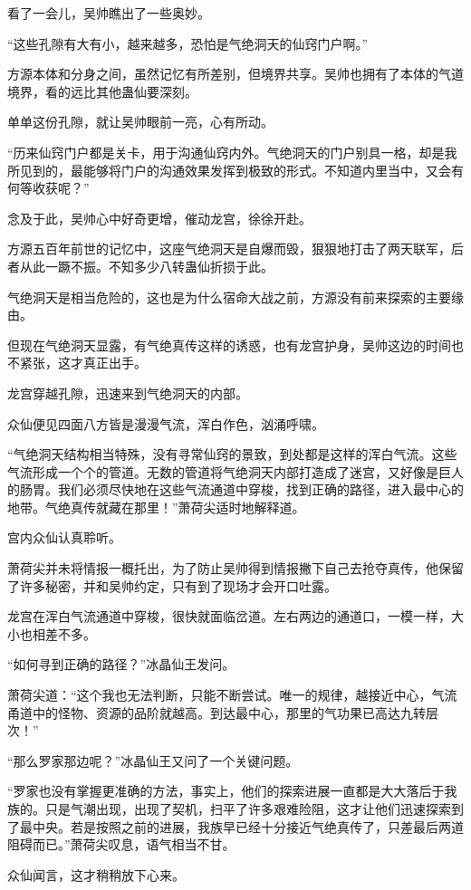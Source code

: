 \begin{this_body}
看了一会儿，吴帅瞧出了一些奥妙。

“这些孔隙有大有小，越来越多，恐怕是气绝洞天的仙窍门户啊。”

方源本体和分身之间，虽然记忆有所差别，但境界共享。吴帅也拥有了本体的气道境界，看的远比其他蛊仙要深刻。

单单这份孔隙，就让吴帅眼前一亮，心有所动。

“历来仙窍门户都是关卡，用于沟通仙窍内外。气绝洞天的门户别具一格，却是我所见到的，最能够将门户的沟通效果发挥到极致的形式。不知道内里当中，又会有何等收获呢？”

念及于此，吴帅心中好奇更增，催动龙宫，徐徐开赴。

方源五百年前世的记忆中，这座气绝洞天是自爆而毁，狠狠地打击了两天联军，后者从此一蹶不振。不知多少八转蛊仙折损于此。

气绝洞天是相当危险的，这也是为什么宿命大战之前，方源没有前来探索的主要缘由。

但现在气绝洞天显露，有气绝真传这样的诱惑，也有龙宫护身，吴帅这边的时间也不紧张，这才真正出手。

龙宫穿越孔隙，迅速来到气绝洞天的内部。

众仙便见四面八方皆是漫漫气流，浑白作色，汹涌呼啸。

“气绝洞天结构相当特殊，没有寻常仙窍的景致，到处都是这样的浑白气流。这些气流形成一个个的管道。无数的管道将气绝洞天内部打造成了迷宫，又好像是巨人的肠胃。我们必须尽快地在这些气流通道中穿梭，找到正确的路径，进入最中心的地带。气绝真传就藏在那里！”萧荷尖适时地解释道。

宫内众仙认真聆听。

萧荷尖并未将情报一概托出，为了防止吴帅得到情报撇下自己去抢夺真传，他保留了许多秘密，并和吴帅约定，只有到了现场才会开口吐露。

龙宫在浑白气流通道中穿梭，很快就面临岔道。左右两边的通道口，一模一样，大小也相差不多。

“如何寻到正确的路径？”冰晶仙王发问。

萧荷尖道：“这个我也无法判断，只能不断尝试。唯一的规律，越接近中心，气流甬道中的怪物、资源的品阶就越高。到达最中心，那里的气功果已高达九转层次！”

“那么罗家那边呢？”冰晶仙王又问了一个关键问题。

“罗家也没有掌握更准确的方法，事实上，他们的探索进展一直都是大大落后于我族的。只是气潮出现，出现了契机，扫平了许多艰难险阻，这才让他们迅速探索到了最中央。若是按照之前的进展，我族早已经十分接近气绝真传了，只差最后两道阻碍而已。”萧荷尖叹息，语气相当不甘。

众仙闻言，这才稍稍放下心来。


\end{this_body}
